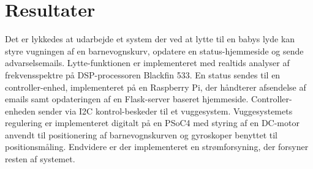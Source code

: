 \chapter{Resultater}

Det er lykkedes at udarbejde et system der ved at lytte til en babys lyde kan styre vugningen af en barnevognskurv, opdatere en status-hjemmeside og sende advarselsemails. Lytte-funktionen er implementeret med realtids analyser af frekvensspektre på DSP-processoren Blackfin 533. En status sendes til en controller-enhed, implementeret på en Raspberry Pi, der håndterer afsendelse af emails samt opdateringen af en Flask-server baseret hjemmeside. Controller-enheden sender via I2C kontrol-beskeder til et vuggesystem. Vuggesystemets regulering er implementeret digitalt på en PSoC4 med styring af en DC-motor anvendt til positionering af barnevognskurven og gyroskoper benyttet til positionsmåling. Endvidere er der implementeret en strømforsyning, der forsyner resten af systemet.